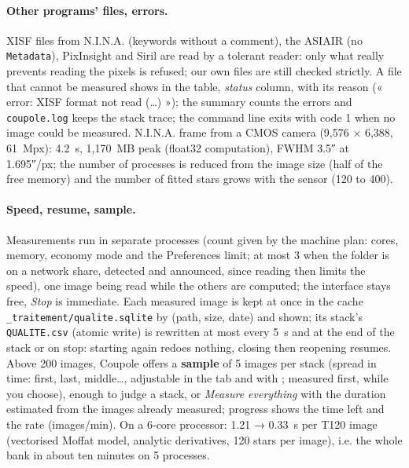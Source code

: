 \paragraph{Other programs' files, errors.} XISF files from N.I.N.A. (keywords without a comment), the ASIAIR (no
\texttt{Metadata}), PixInsight and Siril are read by a tolerant reader: only what really prevents reading the pixels
is refused; our own files are still checked strictly. A file that cannot be measured shows in the table,
\emph{status} column, with its reason (« error: XISF format not read (…) »); the summary counts the errors and
\texttt{coupole.log} keeps the stack trace; the command line exits with code 1 when no image could be measured.
N.I.N.A. frame from a CMOS camera (9,576 × 6,388, 61~Mpx): 4.2~s, 1,170~MB peak (float32 computation), FWHM 3.5″
at 1.695″/px; the number of processes is reduced from the image size (half of the free memory) and the number of
fitted stars grows with the sensor (120 to 400).

\paragraph{Speed, resume, sample.} Measurements run in separate processes (count given by the machine plan: cores,
memory, economy mode and the Preferences limit; at most 3 when the folder is on a network share, detected and
announced, since reading then limits the speed), one image being read while the others are computed; the interface
stays free, \emph{Stop} is immediate. Each measured image is kept at once in the cache
\texttt{\_traitement/qualite.sqlite} by (path, size, date) and shown; its stack's \texttt{QUALITE.csv} (atomic write)
is rewritten at most every 5~s and at the end of the stack or on stop: starting again redoes nothing, closing then
reopening resumes. Above 200 images, Coupole offers a \textbf{sample} of
5 images per stack (spread in time: first, last, middle…, adjustable in the tab and with ; measured
first, while you choose), enough to judge a stack, or \emph{Measure everything} with the duration estimated from the
images already measured; progress shows the
time left and the rate (images/min). On a 6-core processor: 1.21 → 0.33~s per T120 image (vectorised
Moffat model, analytic derivatives, 120 stars per image), i.e. the whole bank in about ten minutes on 5 processes.


